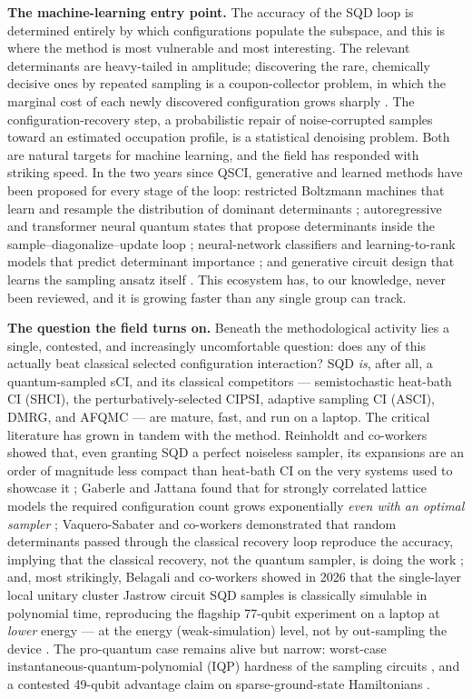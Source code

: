 \documentclass[11pt]{article}
\begin{document}
\textbf{The machine-learning entry point.} The accuracy of the SQD loop is determined entirely by which configurations populate the subspace, and this is where the method is most vulnerable and most interesting. The relevant determinants are heavy-tailed in amplitude; discovering the rare, chemically decisive ones by repeated sampling is a coupon-collector problem, in which the marginal cost of each newly discovered configuration grows sharply \cite{reinholdt2025}. The configuration-recovery step, a probabilistic repair of noise-corrupted samples toward an estimated occupation profile, is a statistical denoising problem. Both are natural targets for machine learning, and the field has responded with striking speed. In the two years since QSCI, generative and learned methods have been proposed for every stage of the loop: restricted Boltzmann machines that learn and resample the distribution of dominant determinants \cite{patra2025,patra2026}; autoregressive and transformer neural quantum states that propose determinants inside the sample--diagonalize--update loop \cite{chang2026,solanki2026,shang2025}; neural-network classifiers and learning-to-rank models that predict determinant importance \cite{zeni2026,zhanghaar2025,nie2026}; and generative circuit design that learns the sampling ansatz itself \cite{kemmoku2026}. This ecosystem has, to our knowledge, never been reviewed, and it is growing faster than any single group can track.

\textbf{The question the field turns on.} Beneath the methodological activity lies a single, contested, and increasingly uncomfortable question: does any of this actually beat classical selected configuration interaction? SQD \emph{is}, after all, a quantum-sampled sCI, and its classical competitors --- semistochastic heat-bath CI (SHCI), the perturbatively-selected CIPSI, adaptive sampling CI (ASCI), DMRG, and AFQMC --- are mature, fast, and run on a laptop. The critical literature has grown in tandem with the method. Reinholdt and co-workers showed that, even granting SQD a perfect noiseless sampler, its expansions are an order of magnitude less compact than heat-bath CI on the very systems used to showcase it \cite{reinholdt2025}; Gaberle and Jattana found that for strongly correlated lattice models the required configuration count grows exponentially \emph{even with an optimal sampler} \cite{gaberle2026}; Vaquero-Sabater and co-workers demonstrated that random determinants passed through the classical recovery loop reproduce the accuracy, implying that the classical recovery, not the quantum sampler, is doing the work \cite{vaquerosabater2026}; and, most strikingly, Belagali and co-workers showed in 2026 that the single-layer local unitary cluster Jastrow circuit SQD samples is classically simulable in polynomial time, reproducing the flagship 77-qubit experiment on a laptop at \emph{lower} energy --- at the energy (weak-simulation) level, not by out-sampling the device \cite{belagali2026}. The pro-quantum case remains alive but narrow: worst-case instantaneous-quantum-polynomial (IQP) hardness of the sampling circuits \cite{hafid2025}, and a contested 49-qubit advantage claim on sparse-ground-state Hamiltonians \cite{kirby2026}.
\end{document}
